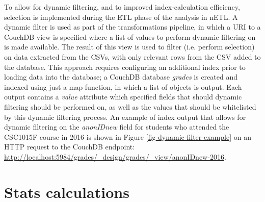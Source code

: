 To allow for dynamic filtering, and to improved index-calculation efficiency, selection is implemented during the ETL phase of the analysis in nETL. A dynamic filter is used as part of the transformations pipeline, in which a URI to a CouchDB view is specified where a list of values to perform dynamic filtering on is made available. The result of this view is used to filter (i.e. perform selection) on data extracted from the CSVs, with only relevant rows from the CSV added to the database. This approach requires configuring an additional index prior to loading data into the database; a CouchDB database \textit{grades} is created and indexed using just a map function, in which a list of objects is output. Each output contains a \textit{value} attribute which specified fields that should dynamic filtering should be performed on, as well as the values that should be whitelisted by this dynamic filtering process. An example of index output that allows for dynamic filtering on the \textit{anonIDnew} field for students who attended the CSC1015F course in 2016 is shown in Figure \ref{fig-dynamic-filter-example} on an HTTP request to the CouchDB endpoint: \url{http://localhost:5984/grades/_design/grades/_view/anonIDnew-2016}.



\section{Stats calculations}
